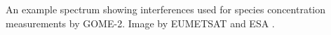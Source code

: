 \label{fig:gomeproducts}
An example spectrum showing interferences used for species concentration measurements by GOME-2. Image by EUMETSAT and ESA \cite{GOME2Image}.